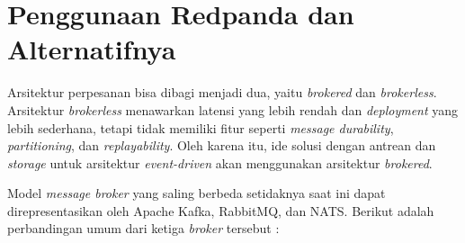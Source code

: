 \section{Penggunaan Redpanda dan Alternatifnya}

Arsitektur perpesanan bisa dibagi menjadi dua, yaitu \textit{brokered} dan \textit{brokerless}. Arsitektur \textit{brokerless} menawarkan latensi yang lebih rendah dan \textit{deployment} yang lebih sederhana, tetapi tidak memiliki fitur seperti \textit{message durability}, \textit{partitioning}, dan \textit{replayability}. Oleh karena itu, ide solusi dengan antrean dan \textit{storage} untuk arsitektur \textit{event-driven} akan menggunakan arsitektur \textit{brokered}.

Model \textit{message broker} yang saling berbeda setidaknya saat ini dapat direpresentasikan oleh Apache Kafka, RabbitMQ, dan NATS. Berikut adalah perbandingan umum dari ketiga \textit{broker} tersebut \parencite{arshadChoosingTheRightMessaging,royNatsRmqKafka,studyOnModeryMessaging}:

